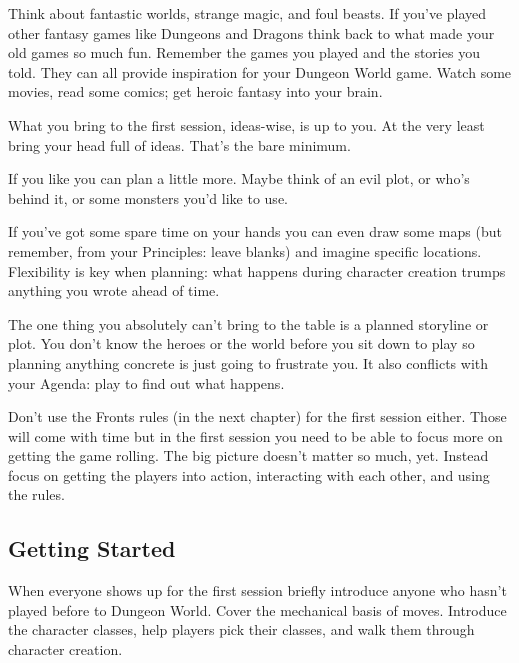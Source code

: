  

Think about fantastic worlds, strange magic, and foul beasts. If you've played other fantasy games like Dungeons and Dragons think back to what made your old games so much fun. Remember the games you played and the stories you told. They can all provide inspiration for your Dungeon World game. Watch some movies, read some comics; get heroic fantasy into your brain.

 

What you bring to the first session, ideas-wise, is up to you. At the very least bring your head full of ideas. That's the bare minimum.

 

If you like you can plan a little more. Maybe think of an evil plot, or who's behind it, or some monsters you'd like to use.

 

If you've got some spare time on your hands you can even draw some maps (but remember, from your Principles: leave blanks) and imagine specific locations. Flexibility is key when planning: what happens during character creation trumps anything you wrote ahead of time.

 

The one thing you absolutely can't bring to the table is a planned storyline or plot. You don't know the heroes or the world before you sit down to play so planning anything concrete is just going to frustrate you. It also conflicts with your Agenda: play to find out what happens.

 

Don't use the Fronts rules (in the next chapter) for the first session either. Those will come with time but in the first session you need to be able to focus more on getting the game rolling. The big picture doesn't matter so much, yet. Instead focus on getting the players into action, interacting with each other, and using the rules.

 
\subsection{Getting Started}   
 

When everyone shows up for the first session briefly introduce anyone who hasn't played before to Dungeon World. Cover the mechanical basis of moves. Introduce the character classes, help players pick their classes, and walk them through character creation.

 

